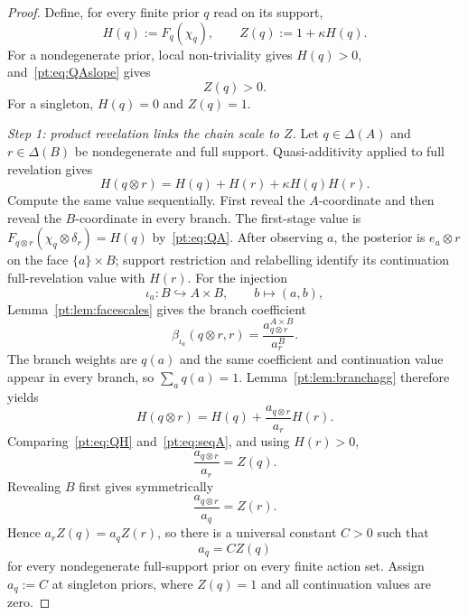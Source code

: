 \documentclass[11pt,a4paper]{article}
\theoremstyle{definition}
\newcommand{\1}{\mathbf 1}
\begin{document}
\begin{proof}
Define, for every finite prior $q$ read on its support,
\[
H(q):=F_q(\chi_q),
\qquad
Z(q):=1+\kappa H(q).
\]
For a nondegenerate prior, local non-triviality gives $H(q)>0$, and~\eqref{pt:eq:QAslope} gives
\begin{equation}
Z(q)>0.
\tag{Z+}\label{pt:eq:Zpositive}
\end{equation}
For a singleton, $H(q)=0$ and $Z(q)=1$.

\emph{Step 1: product revelation links the chain scale to $Z$.}
Let $q\in\Delta(A)$ and $r\in\Delta(B)$ be nondegenerate and full support.  Quasi-additivity applied to full revelation
gives
\begin{equation}
H(q\otimes r)=H(q)+H(r)+\kappa H(q)H(r).
\tag{QH}\label{pt:eq:QH}
\end{equation}
Compute the same value sequentially.  First reveal the $A$-coordinate and then reveal the $B$-coordinate in every branch.
The first-stage value is $F_{q\otimes r}(\chi_q\otimes\delta_r)=H(q)$ by~\eqref{pt:eq:QA}.  After observing $a$, the
posterior is $e_a\otimes r$ on the face $\{a\}\times B$; support restriction and relabelling identify its continuation
full-revelation value with $H(r)$.  For the injection
\[
\iota_a:B\hookrightarrow A\times B,\qquad b\mapsto(a,b),
\]
Lemma~\ref{pt:lem:facescales} gives the branch coefficient
\[
\beta_{\iota_a}(q\otimes r,r)=\frac{a^{A\times B}_{q\otimes r}}{a^B_r}.
\]
The branch weights are $q(a)$ and the same coefficient and continuation value appear in every branch, so
$\sum_a q(a)=1$.  Lemma~\ref{pt:lem:branchagg} therefore yields
\begin{equation}
H(q\otimes r)=H(q)+\frac{a_{q\otimes r}}{a_r}H(r).
\tag{SA}\label{pt:eq:seqA}
\end{equation}
Comparing~\eqref{pt:eq:QH} and~\eqref{pt:eq:seqA}, and using $H(r)>0$,
\begin{equation}
\frac{a_{q\otimes r}}{a_r}=Z(q).
\tag{R1}\label{pt:eq:ratio1}
\end{equation}
Revealing $B$ first gives symmetrically
\begin{equation}
\frac{a_{q\otimes r}}{a_q}=Z(r).
\tag{R2}\label{pt:eq:ratio2}
\end{equation}
Hence $a_rZ(q)=a_qZ(r)$, so there is a universal constant $C>0$ such that
\begin{equation}
a_q=CZ(q)
\tag{AS}\label{pt:eq:ascaleZ}
\end{equation}
for every nondegenerate full-support prior on every finite action set.  Assign $a_q:=C$ at singleton priors, where
$Z(q)=1$ and all continuation values are zero.


\end{proof}
\end{document}
